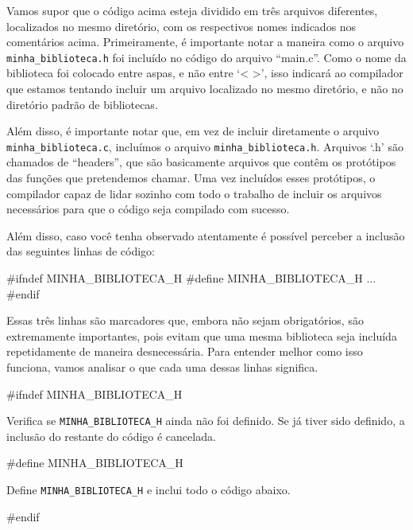 Vamos supor que o código acima esteja dividido em três arquivos diferentes, 
localizados no mesmo diretório, com os respectivos nomes indicados nos 
comentários acima. Primeiramente, é importante notar a maneira como o arquivo 
\texttt{minha\_biblioteca.h} foi incluído no código do arquivo ``main.c''. 
Como o nome da biblioteca foi colocado entre aspas, e não entre `\textless 
\textgreater', isso indicará ao compilador que estamos tentando incluir um 
arquivo localizado no mesmo diretório, e não no diretório padrão de bibliotecas.

Além disso, é importante notar que, em vez de incluir diretamente o arquivo 
\texttt{minha\_biblioteca.c}, incluímos o arquivo \texttt{minha\_biblioteca.h}. 
Arquivos `.h' são chamados de ``headers'', que são basicamente arquivos que 
contêm os protótipos das funções que pretendemos chamar. Uma vez incluídos 
esses protótipos, o compilador capaz de lidar sozinho com todo o trabalho de 
incluir os arquivos necessários para que o código seja compilado com sucesso.

Além disso, caso você tenha observado atentamente é possível perceber a 
inclusão das seguintes linhas de código:

\begin{excode}
    #ifndef MINHA_BIBLIOTECA_H
    #define MINHA_BIBLIOTECA_H
    ...
    #endif
\end{excode}

Essas três linhas são marcadores que, embora não sejam obrigatórios, são 
extremamente importantes, pois evitam que uma mesma biblioteca seja incluída 
repetidamente de maneira desnecessária. Para entender melhor como isso 
funciona, vamos analisar o que cada uma dessas linhas significa.

\begin{excode}
    #ifndef MINHA_BIBLIOTECA_H
\end{excode}

Verifica se \texttt{MINHA\_BIBLIOTECA\_H} ainda não foi definido. Se já tiver sido definido, a inclusão do restante do código é cancelada.

\begin{excode}
    #define MINHA_BIBLIOTECA_H
\end{excode}

Define \texttt{MINHA\_BIBLIOTECA\_H} e inclui todo o código abaixo.

\begin{excode}
    #endif
\end{excode}


